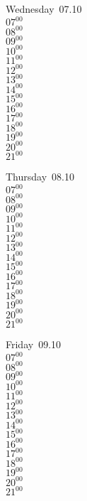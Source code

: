 \documentclass[11pt,a4paper]{book}\usepackage[]{graphicx}\usepackage[]{color}
\begin{document}
\begin{weekdaybox}
  Wednesday~07.10\\
  { 
  \vfill
  $07^{00}$\\
$08^{00}$\\
$09^{00}$\\
$10^{00}$\\
$11^{00}$\\
$12^{00}$\\
$13^{00}$\\
$14^{00}$\\
$15^{00}$\\
$16^{00}$\\
$17^{00}$\\
$18^{00}$\\
$19^{00}$\\
$20^{00}$\\
$21^{00}$\\
  }
\end{weekdaybox}
\clearpage
\begin{headerbox}
\end{headerbox}
\begin{weekdaybox}
  Thursday~08.10\\
  { 
  \vfill
  $07^{00}$\\
$08^{00}$\\
$09^{00}$\\
$10^{00}$\\
$11^{00}$\\
$12^{00}$\\
$13^{00}$\\
$14^{00}$\\
$15^{00}$\\
$16^{00}$\\
$17^{00}$\\
$18^{00}$\\
$19^{00}$\\
$20^{00}$\\
$21^{00}$\\
  }
\end{weekdaybox} 
\begin{weekdaybox}
  Friday~09.10\\
  { 
  \vfill
  $07^{00}$\\
$08^{00}$\\
$09^{00}$\\
$10^{00}$\\
$11^{00}$\\
$12^{00}$\\
$13^{00}$\\
$14^{00}$\\
$15^{00}$\\
$16^{00}$\\
$17^{00}$\\
$18^{00}$\\
$19^{00}$\\
$20^{00}$\\
$21^{00}$\\
  }
\end{weekdaybox}
\end{document}
